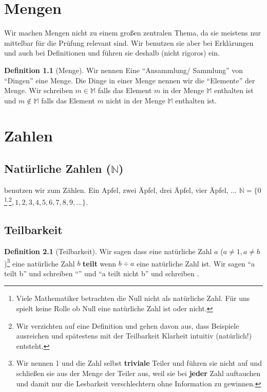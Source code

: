 \documentclass[a4paper]{book}%
\theoremstyle{definition}
\newtheorem{definition}{Definition}
\begin{document}
\chapter{Mengen}

Wir machen Mengen nicht zu einem großen zentralen Thema, da sie meistens nur mittelbar für die Prüfung relevant sind. Wir benutzen sie aber bei Erklärungen und auch bei Definitionen und führen sie deshalb (nicht rigoros) ein.

\begin{definition}[Menge]
    Wir nennen Eine \enquote{Ansammlung/ Sammlung} von \enquote{Dingen} eine Menge. Die Dinge in einer Menge nennen wir die \enquote{Elemente} der Menge. Wir schreiben $m \in \mathbb{M}$ falls das Element $m$ in der Menge $\mathbb{M}$ enthalten ist und $m \notin \mathbb{M}$ falls das Element $m$ nicht in der Menge $\mathbb{M}$ enthalten ist.
\end{definition}


\chapter{Zahlen}

\section{Natürliche Zahlen ($\mathbb{N}$)}

\textbf{} benutzen wir zum Zählen. Ein Apfel, zwei Äpfel, drei Äpfel, vier Äpfel, ... $\mathbb{N} = \{ 0$\footnote{Viele Mathematiker betrachten die Null nicht als natürliche Zahl. Für uns spielt keine Rolle ob Null eine natürliche Zahl ist oder nicht.}\textsuperscript{,}\footnote{Wir verzichten auf eine Definition und gehen davon aus, dass Beispiele ausreichen und spätestens mit der Teilbarkeit Klarheit intuitiv (natürlich!) entsteht.}$, 1, 2, 3, 4, 5, 6, 7, 8, 9, ...\}$.


\section{Teilbarkeit}\label{def:teilbarkeit}

\begin{definition}[Teilbarkeit]
    Wir sagen dass eine natürliche Zahl $a$ ($a \neq 1, a \neq b$)\footnote{Wir nennen 1 und die Zahl selbst \textbf{triviale} Teiler und führen sie nicht auf und schließen sie aus der Menge der Teiler aus, weil sie bei \textbf{jeder} Zahl auftauchen und damit nur die Lesbarkeit verschlechtern ohne Information zu gewinnen.} eine natürliche Zahl $b$ \textbf{teilt} wenn $b \div a$ eine natürliche Zahl ist. Wir sagen \enquote{a teilt b} und schreiben \enquote{} und \enquote{a teilt nicht b} und schreiben .
\end{definition}
\end{document}
